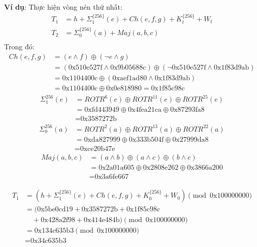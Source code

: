 \begin{enumerate}[label=\textbf{Bước \arabic*:}, leftmargin = 2.5cm]
{\textbf{Ví dụ}: Thực hiện vòng nén thứ nhất:
\begin{align*}
T_1 &= h + \Sigma_1^{\{256\}}(e)+Ch(e,f,g)+K_t^{\{256\}}+ W_t\\ 
T_2 &= \Sigma_0^{\{256\}}(a) + Maj(a,b,c) \\
\end{align*}
Trong đó:
\begin{align*}
	Ch(e,f,g) &= (e\land f) \oplus (\neg e\land g)\\
	&= (\text{0x510e527f} \land \text{0x9b05688c}) \oplus (\neg \text{0x510e527f} \land \text{0x1f83d9ab}) \\
	&= \text{0x1104400c} \oplus (\text{0xaef1ad80} \land \text{0x1f83d9ab}) \\
	&= \text{0x1104400c} \oplus \text{0x0e818980} = \text{0x1f85c98c} 
\end{align*}
\begin{align*}
\Sigma_1^{{256}}(e) &= ROTR^6(e) \oplus ROTR^{11}(e) \oplus ROTR^{25}(e) \\
	&= \text{0xfd443949} \oplus \text{0x4fea21ca} \oplus \text{0x87293fa8} \\
	&= \text{0x3587272b}
\end{align*}
\begin{align*}
\Sigma_0^{{256}}(a) &= ROTR^2(a) \oplus ROTR^{13}(a) \oplus ROTR^{22}(a) \\
	&= \text{0xda827999} \oplus \text{0x333b504f} \oplus \text{0x27999da8} \\
	&= \text{0xce20b47e}
\end{align*}
\begin{align*}
	Maj(a,b,c) &= (a \land b) \oplus (a \land c) \oplus (b \land c) \\
	&= \text{0x2a01a605} \oplus \text{0x2808e262} \oplus \text{0x3866a200} \\
	&= \text{0x3a6fe667}
\end{align*}

	\begin{align*}
		T_1 &= (h + \Sigma_1^{\{256\}}(e) + Ch(e, f, g) + K_0^{\{256\}} + W_0) \pmod{\text{0x100000000}} \\
		&= (\text{0x5be0cd19} + \text{0x3587272b} + \text{0x1f85c98c} \\
		&\quad + \text{0x428a2f98} + \text{0x414e484b}) \pmod{\text{0x100000000}} \\
		&= \text{0x134c635b3} \pmod{\text{0x100000000}} \\
		&= \text{0x34c635b3}
	\end{align*}

}
\end{enumerate}
